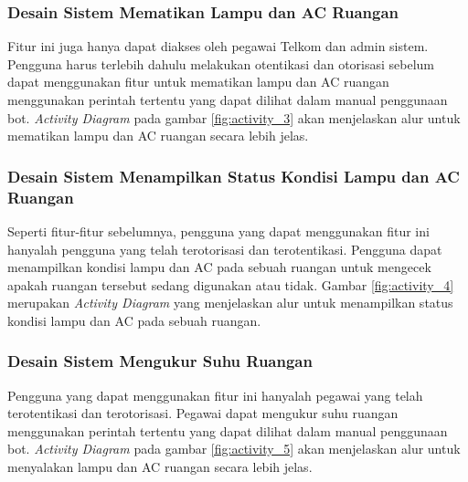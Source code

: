 \subsubsection{Desain Sistem Mematikan Lampu dan AC Ruangan}
\tab Fitur ini juga hanya dapat diakses oleh pegawai Telkom dan admin sistem. Pengguna harus terlebih dahulu melakukan otentikasi dan otorisasi sebelum dapat menggunakan fitur untuk mematikan lampu dan AC ruangan menggunakan perintah tertentu yang dapat dilihat dalam manual penggunaan bot. \textit{Activity Diagram} pada gambar \ref{fig:activity_3} akan menjelaskan alur untuk mematikan lampu dan AC ruangan secara lebih jelas.

\subsubsection{Desain Sistem Menampilkan Status Kondisi Lampu dan AC Ruangan}
\tab Seperti fitur-fitur sebelumnya, pengguna yang dapat menggunakan fitur ini hanyalah pengguna yang telah terotorisasi dan terotentikasi. Pengguna dapat menampilkan kondisi lampu dan AC pada sebuah ruangan untuk mengecek apakah ruangan tersebut sedang digunakan atau tidak. Gambar \ref{fig:activity_4} merupakan \textit{Activity Diagram} yang menjelaskan alur untuk menampilkan status kondisi lampu dan AC pada sebuah ruangan.

\subsubsection{Desain Sistem Mengukur Suhu Ruangan}
\tab Pengguna yang dapat menggunakan fitur ini hanyalah pegawai yang telah terotentikasi dan terotorisasi. Pegawai dapat mengukur suhu ruangan menggunakan perintah tertentu yang dapat dilihat dalam manual penggunaan bot. \textit{Activity Diagram} pada gambar \ref{fig:activity_5} akan menjelaskan alur untuk menyalakan lampu dan AC ruangan secara lebih jelas.
